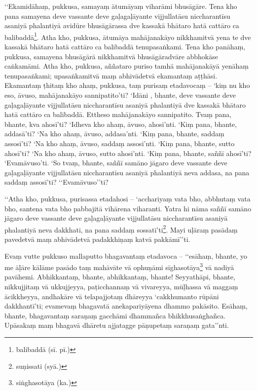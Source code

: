 ‘‘Ekamidāhaṃ, pukkusa, samayaṃ ātumāyaṃ viharāmi bhusāgāre. Tena kho pana samayena deve vassante deve gaḷagaḷāyante vijjullatāsu niccharantīsu asaniyā phalantiyā avidūre bhusāgārassa dve kassakā bhātaro hatā cattāro ca balibaddā\footnote{balibaddā (sī. pī.)}. Atha kho, pukkusa, ātumāya mahājanakāyo nikkhamitvā yena te dve kassakā bhātaro hatā cattāro ca balibaddā tenupasaṅkami. Tena kho panāhaṃ, pukkusa, samayena bhusāgārā nikkhamitvā bhusāgāradvāre abbhokāse caṅkamāmi. Atha kho, pukkusa, aññataro puriso tamhā mahājanakāyā yenāhaṃ tenupasaṅkami; upasaṅkamitvā maṃ abhivādetvā ekamantaṃ aṭṭhāsi. Ekamantaṃ ṭhitaṃ kho ahaṃ, pukkusa, taṃ purisaṃ etadavocaṃ – ‘kiṃ nu kho eso, āvuso, mahājanakāyo sannipatito’ti? ‘Idāni , bhante, deve vassante deve gaḷagaḷāyante vijjullatāsu niccharantīsu asaniyā phalantiyā dve kassakā bhātaro hatā cattāro ca balibaddā. Ettheso mahājanakāyo sannipatito. Tvaṃ pana, bhante, kva ahosī’ti? ‘Idheva kho ahaṃ, āvuso, ahosi’nti. ‘Kiṃ pana, bhante, addasā’ti? ‘Na kho ahaṃ, āvuso, addasa’nti. ‘Kiṃ pana, bhante, saddaṃ assosī’ti? ‘Na kho ahaṃ, āvuso, saddaṃ assosi’nti. ‘Kiṃ pana, bhante, sutto ahosī’ti? ‘Na kho ahaṃ, āvuso, sutto ahosi’nti. ‘Kiṃ pana, bhante, saññī ahosī’ti? ‘Evamāvuso’ti. ‘So tvaṃ, bhante, saññī samāno jāgaro deve vassante deve gaḷagaḷāyante vijjullatāsu niccharantīsu asaniyā phalantiyā neva addasa, na pana saddaṃ assosī’ti? ‘‘Evamāvuso’’ti?

‘‘Atha kho, pukkusa, purisassa etadahosi – ‘acchariyaṃ vata bho, abbhutaṃ vata bho, santena vata bho pabbajitā vihārena viharanti. Yatra hi nāma saññī samāno jāgaro deve vassante deve gaḷagaḷāyante vijjullatāsu niccharantīsu asaniyā phalantiyā neva dakkhati, na pana saddaṃ sossatī’ti\footnote{suṇissati (syā.)}. Mayi uḷāraṃ pasādaṃ pavedetvā maṃ abhivādetvā padakkhiṇaṃ katvā pakkāmī’’ti.

Evaṃ vutte pukkuso mallaputto bhagavantaṃ etadavoca – ‘‘esāhaṃ, bhante, yo me āḷāre kālāme pasādo taṃ mahāvāte vā ophuṇāmi sīghasotāya\footnote{siṅghasotāya (ka.)} vā nadiyā pavāhemi. Abhikkantaṃ, bhante, abhikkantaṃ, bhante! Seyyathāpi, bhante, nikkujjitaṃ vā ukkujjeyya, paṭicchannaṃ vā vivareyya, mūḷhassa vā maggaṃ ācikkheyya, andhakāre vā telapajjotaṃ dhāreyya ‘cakkhumanto rūpāni dakkhantī’ti; evamevaṃ bhagavatā anekapariyāyena dhammo pakāsito. Esāhaṃ, bhante, bhagavantaṃ saraṇaṃ gacchāmi dhammañca bhikkhusaṅghañca. Upāsakaṃ maṃ bhagavā dhāretu ajjatagge pāṇupetaṃ saraṇaṃ gata’’nti.

